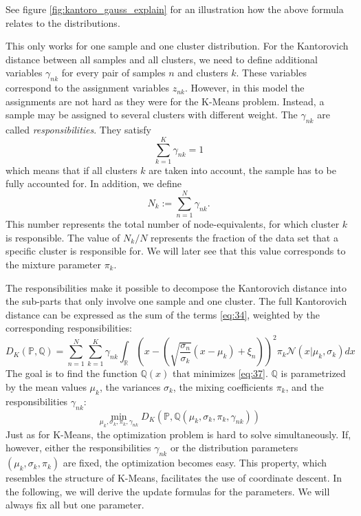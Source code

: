 See figure \ref{fig:kantoro_gauss_explain} for an illustration how the above formula relates to the distributions.

This only works for one sample and one cluster distribution.
For the Kantorovich distance between all samples and all clusters, we need to define additional variables $\gamma_{nk}$ for every pair of samples $n$ and clusters $k$.
These variables correspond to the assignment variables $z_{nk}$.
However, in this model the assignments are not hard as they were for the K-Means problem.
Instead, a sample may be assigned to several clusters with different weight.
The $\gamma_{nk}$ are called \textit{responsibilities}.
They satisfy
\begin{equation}
  \label{eq:35}
  \sum_{k=1}^K\gamma_{nk} = 1
\end{equation}
which means that if all clusters $k$ are taken into account, the sample has to be fully accounted for.
In addition, we define
\begin{equation}
  \label{eq:36}
  N_k := \sum_{n=1}^N \gamma_{nk}.
\end{equation}
This number represents the total number of node-equivalents, for which cluster $k$ is responsible.
The value of $N_k/N$ represents the fraction of the data set that a specific cluster is responsible for.
We will later see that this value corresponds to the mixture parameter $\pi_k$.

The responsibilities make it possible to decompose the Kantorovich distance into the sub-parts that only involve one sample and one cluster.
The full Kantorovich distance can be expressed as the sum of the terms \eqref{eq:34}, weighted by the corresponding responsibilities:
\begin{equation}
  \label{eq:37}
  D_K(\mathbb{P,Q}) = \sum_{n=1}^N\sum_{k=1}^K\gamma_{nk}\int_\mathbb{R}\left(x-\left(\sqrt{\frac{\sigma_n}{\sigma_k}}(x-\mu_k)+\xi_n\right)\right)^2\pi_k\mathcal{N}(x|\mu_k,\sigma_k)dx
\end{equation}
The goal is to find the function $\mathbb{Q}(x)$ that minimizes \eqref{eq:37}.
$\mathbb{Q}$ is parametrized by the mean values $\mu_k$, the variances $\sigma_k$, the mixing coefficients $\pi_k$, and the responsibilities $\gamma_{nk}$:
\begin{equation}
  \label{eq:38}
  \min\limits_{\mu_k,\sigma_k,\pi_k, \gamma_{nk}}D_K(\mathbb{P,Q}(\mu_k,\sigma_k,\pi_k, \gamma_{nk}))
\end{equation}
Just as for K-Means, the optimization problem is hard to solve simultaneously.
If, however, either the responsibilities $\gamma_{nk}$ or the distribution parameters $(\mu_k, \sigma_k, \pi_k)$ are fixed, the optimization becomes easy.
This property, which resembles the structure of K-Means, facilitates the use of coordinate descent.
In the following, we will derive the update formulas for the parameters.
We will always fix all but one parameter.


